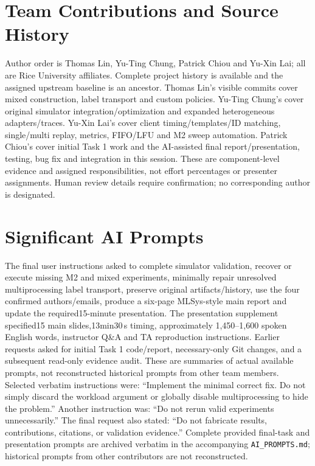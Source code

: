 \documentclass{article}
\begin{document}
\section{Team Contributions and Source History}
Author order is Thomas Lin, Yu-Ting Chung, Patrick Chiou and Yu-Xin Lai; all are Rice University affiliates. Complete project history is available and the assigned upstream baseline is an ancestor. Thomas Lin's visible commits cover mixed construction, label transport and custom policies. Yu-Ting Chung's cover original simulator integration/optimization and expanded heterogeneous adapters/traces. Yu-Xin Lai's cover client timing/templates/ID matching, single/multi replay, metrics, FIFO/LFU and M2 sweep automation. Patrick Chiou's cover initial Task 1 work and the AI-assisted final report/presentation, testing, bug fix and integration in this session. These are component-level evidence and assigned responsibilities, not effort percentages or presenter assignments. Human review details require confirmation; no corresponding author is designated.

\section{Significant AI Prompts}
The final user instructions asked to complete simulator validation, recover or execute missing M2 and mixed experiments, minimally repair unresolved multiprocessing label transport, preserve original artifacts/history, use the four confirmed authors/emails, produce a six-page MLSys-style main report and update the required15-minute presentation. The presentation supplement specified15 main slides,13min30\,s timing, approximately 1,450--1,600 spoken English words, instructor Q\&A and TA reproduction instructions. Earlier requests asked for initial Task 1 code/report, necessary-only Git changes, and a subsequent read-only evidence audit. These are summaries of actual available prompts, not reconstructed historical prompts from other team members. Selected verbatim instructions were: ``Implement the minimal correct fix. Do not simply discard the workload argument or globally disable multiprocessing to hide the problem.'' Another instruction was: ``Do not rerun valid experiments unnecessarily.'' The final request also stated: ``Do not fabricate results, contributions, citations, or validation evidence.'' Complete provided final-task and presentation prompts are archived verbatim in the accompanying \texttt{AI\_PROMPTS.md}; historical prompts from other contributors are not reconstructed.
\end{document}
